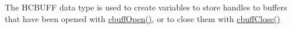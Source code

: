 \label{group___c_b_u_f_fdata_types_ga554880d758aa53ae40930fbb49412e60}
The HCBUFF data type is used to create variables to store handles to buffers that have been opened with \hyperlink{group___c_b_u_f_fopen_c_lose_functions_ga4b124282950602630a84fb4dded3f452}{cbuffOpen()}, or to close them with \hyperlink{group___c_b_u_f_fopen_c_lose_functions_ga66a96e9abf5e7ea12779edb9c49c3043}{cbuffClose()} 